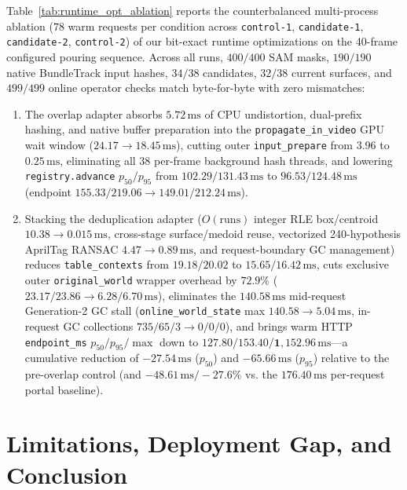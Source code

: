 \documentclass[10pt,journal]{IEEEtran}
\begin{document}
Table~\ref{tab:runtime_opt_ablation} reports the counterbalanced multi-process ablation ($78$ warm requests per condition across \texttt{control-1}, \texttt{candidate-1}, \texttt{candidate-2}, \texttt{control-2}) of our bit-exact runtime optimizations on the 40-frame configured pouring sequence. Across all runs, $400/400$ SAM masks, $190/190$ native BundleTrack input hashes, $34/38$ candidates, $32/38$ current surfaces, and $499/499$ online operator checks match byte-for-byte with zero mismatches:
\begin{enumerate}
    \item The overlap adapter absorbs $5.72\,\mathrm{ms}$ of CPU undistortion, dual-prefix hashing, and native buffer preparation into the \texttt{propagate\_in\_video} GPU wait window ($24.17\to 18.45\,\mathrm{ms}$), cutting outer \texttt{input\_prepare} from $3.96$ to $0.25\,\mathrm{ms}$, eliminating all $38$ per-frame background hash threads, and lowering \texttt{registry.advance} $p_{50}/p_{95}$ from $102.29/131.43\,\mathrm{ms}$ to $96.53/124.48\,\mathrm{ms}$ (endpoint $155.33/219.06\to 149.01/212.24\,\mathrm{ms}$).
    \item Stacking the deduplication adapter ($O(\text{runs})$ integer RLE box/centroid $10.38\to 0.015\,\mathrm{ms}$, cross-stage surface/medoid reuse, vectorized 240-hypothesis AprilTag RANSAC $4.47\to 0.89\,\mathrm{ms}$, and request-boundary GC management) reduces \texttt{table\_contexts} from $19.18/20.02$ to $15.65/16.42\,\mathrm{ms}$, cuts exclusive outer \texttt{original\_world} wrapper overhead by $\mathbf{72.9\%}$ ($23.17/23.86\to 6.28/6.70\,\mathrm{ms}$), eliminates the $140.58\,\mathrm{ms}$ mid-request Generation-2 GC stall (\texttt{online\_world\_state} max $140.58\to 5.04\,\mathrm{ms}$, in-request GC collections $735/65/3\to 0/0/0$), and brings warm HTTP \texttt{endpoint\_ms} $p_{50}/p_{95}/\max$ down to $\mathbf{127.80/153.40/1{,}152.96\,\mathrm{ms}}$---a cumulative reduction of $\mathbf{-27.54\,\mathrm{ms}}$ ($p_{50}$) and $\mathbf{-65.66\,\mathrm{ms}}$ ($p_{95}$) relative to the pre-overlap control (and $-48.61\,\mathrm{ms}/-27.6\%$ vs. the $176.40\,\mathrm{ms}$ per-request portal baseline).
\end{enumerate}

\section{Limitations, Deployment Gap, and Conclusion}
\label{sec:limitations}
\end{document}
